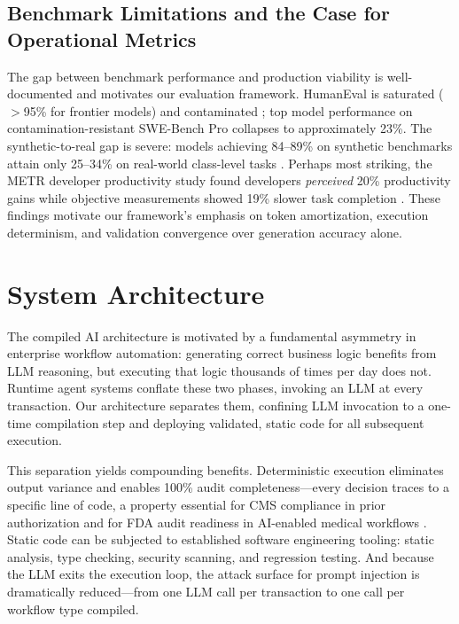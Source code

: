 \documentclass[11pt]{article}
\begin{document}
\subsection{Benchmark Limitations and the Case for Operational Metrics}
\label{sec:related-benchmarks}

The gap between benchmark performance and production viability is well-documented and motivates our evaluation framework. HumanEval is saturated ($>$95\% for frontier models) and contaminated \citep{yang2023rethinking, xu2024contamination}; top model performance on contamination-resistant SWE-Bench Pro collapses to approximately 23\%. The synthetic-to-real gap is severe: models achieving 84--89\% on synthetic benchmarks attain only 25--34\% on real-world class-level tasks \citep{rao2025synthetic}. Perhaps most striking, the METR developer productivity study found developers \emph{perceived} 20\% productivity gains while objective measurements showed 19\% slower task completion \citep{metr2025productivity}. These findings motivate our framework's emphasis on token amortization, execution determinism, and validation convergence over generation accuracy alone.

\section{System Architecture}
\label{sec:architecture}

The compiled AI architecture is motivated by a fundamental asymmetry in enterprise workflow automation: generating correct business logic benefits from LLM reasoning, but executing that logic thousands of times per day does not. Runtime agent systems conflate these two phases, invoking an LLM at every transaction. Our architecture separates them, confining LLM invocation to a one-time compilation step and deploying validated, static code for all subsequent execution.

This separation yields compounding benefits. Deterministic execution eliminates output variance and enables 100\% audit completeness---every decision traces to a specific line of code, a property essential for CMS compliance in prior authorization and for FDA audit readiness in AI-enabled medical workflows \citep{fda2025}. Static code can be subjected to established software engineering tooling: static analysis, type checking, security scanning, and regression testing. And because the LLM exits the execution loop, the attack surface for prompt injection is dramatically reduced---from one LLM call per transaction to one call per workflow type compiled.
\end{document}
